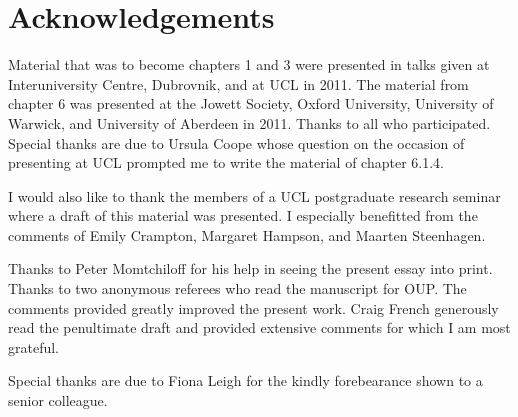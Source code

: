 \chapter*{Acknowledgements} %
\label{cha:acknowledgements}

% 

Material that was to become chapters 1 and 3 were presented in talks given at Interuniversity Centre, Dubrovnik, and at UCL in 2011. The material from chapter 6 was presented at the Jowett Society, Oxford University, University of Warwick, and University of Aberdeen in 2011. Thanks to all who participated. Special thanks are due to Ursula Coope whose question on the occasion of presenting at UCL prompted me to write the material of chapter 6.1.4.

I would also like to thank the members of a UCL postgraduate research seminar where a draft of this material was presented. I especially benefitted from the comments of Emily Crampton, Margaret Hampson, and Maarten Steenhagen.

Thanks to Peter Momtchiloff for his help in seeing the present essay into print. Thanks to two anonymous referees who read the manuscript for OUP. The comments provided greatly improved the present work. Craig French generously read the penultimate draft and provided extensive comments for which I am most grateful.

Special thanks are due to Fiona Leigh for the kindly forebearance shown to a senior colleague.

